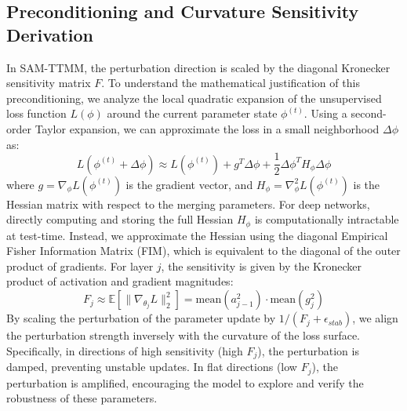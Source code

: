 \documentclass{article}
\theoremstyle{plain}
\theoremstyle{definition}
\theoremstyle{remark}
\begin{document}
\subsection{Preconditioning and Curvature Sensitivity Derivation}
In SAM-TTMM, the perturbation direction is scaled by the diagonal Kronecker sensitivity matrix $F$. To understand the mathematical justification of this preconditioning, we analyze the local quadratic expansion of the unsupervised loss function $L(\phi)$ around the current parameter state $\phi^{(t)}$.
Using a second-order Taylor expansion, we can approximate the loss in a small neighborhood $\Delta \phi$ as:
\begin{equation}
    L(\phi^{(t)} + \Delta \phi) \approx L(\phi^{(t)}) + g^T \Delta \phi + \frac{1}{2} \Delta \phi^T H_\phi \Delta \phi
\end{equation}
where $g = \nabla_\phi L(\phi^{(t)})$ is the gradient vector, and $H_\phi = \nabla_\phi^2 L(\phi^{(t)})$ is the Hessian matrix with respect to the merging parameters.
For deep networks, directly computing and storing the full Hessian $H_\phi$ is computationally intractable at test-time. Instead, we approximate the Hessian using the diagonal Empirical Fisher Information Matrix (FIM), which is equivalent to the diagonal of the outer product of gradients. For layer $j$, the sensitivity is given by the Kronecker product of activation and gradient magnitudes:
\begin{equation}
    F_j \approx \mathbb{E} [ \| \nabla_{\theta_j} L \|_2^2 ] = \text{mean}(a_{j-1}^2) \cdot \text{mean}(g_j^2)
\end{equation}
By scaling the perturbation of the parameter update by $1/(F_j + \epsilon_{stab})$, we align the perturbation strength inversely with the curvature of the loss surface. Specifically, in directions of high sensitivity (high $F_j$), the perturbation is damped, preventing unstable updates. In flat directions (low $F_j$), the perturbation is amplified, encouraging the model to explore and verify the robustness of these parameters.
\end{document}
